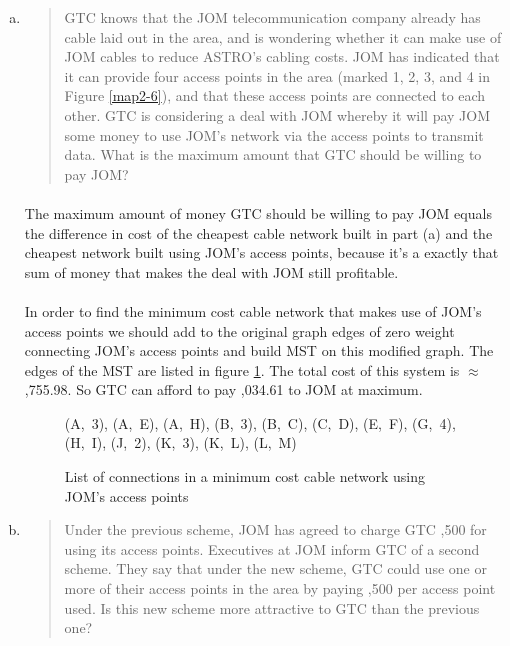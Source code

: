\begin{enumerate}[(a)]
\item\begin{quote}GTC knows that the JOM telecommunication company already has cable laid out
in the area, and is wondering whether it can make use of JOM cables to reduce
ASTRO's cabling costs. JOM has indicated that it can provide four access points
in the area (marked 1, 2, 3, and 4 in Figure \ref{map2-6}), and that these access points are
connected to each other. GTC is considering a deal with JOM whereby it will pay
JOM some money to use JOM's network via the access points to transmit data.
What is the maximum amount that GTC should be willing to pay JOM?\end{quote}

	\paragraph{}
	The maximum amount of money GTC should be willing to pay JOM equals the difference in cost of the cheapest cable network built in part (a) and the cheapest network built using JOM's access points, because it's a exactly that sum of money that makes the deal with JOM still profitable.

	\paragraph{}
	In order to find the minimum cost cable network that makes use of JOM's access points we should add to the original graph edges of zero weight connecting JOM's access points and build MST on this modified graph. The edges of the MST are listed in figure \ref{mst2-6-b}. The total cost of this system is $\approx$ ,755.98. So GTC can afford to pay ,034.61 to JOM at maximum.

\begin{figure}[H]
	\centering
\begin{center}
(A,~3), (A,~E), (A,~H), (B,~3), (B,~C), (C,~D), (E,~F), (G,~4), (H,~I), (J,~2), (K,~3), (K,~L), (L,~M)
\end{center}
	\caption{List of connections in a minimum cost cable network using JOM's access points}
	\label{mst2-6-b}
\end{figure}

\item\begin{quote}Under the previous scheme, JOM has agreed to charge GTC ,500 for using its
access points. Executives at JOM inform GTC of a second scheme. They say that
under the new scheme, GTC could use one or more of their access points in the area
by paying ,500 per access point used.
Is this new scheme more attractive to GTC than the previous one?\end{quote}


\end{enumerate}
